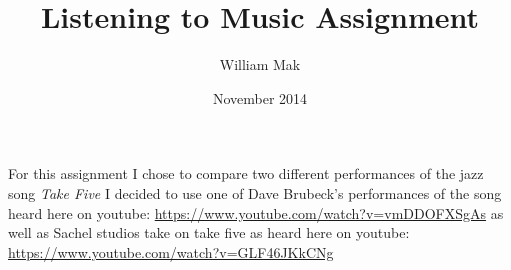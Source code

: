 \documentclass{article}
\title{Listening to Music Assignment}
\author{William Mak}
\date{November 2014}
\begin{document}
\maketitle

For this assignment I chose to compare two different performances of the jazz 
song {\it Take Five} I decided to use one of Dave Brubeck's performances of the 
song heard here on youtube:
\href{https://www.youtube.com/watch?v=vmDDOFXSgAs}{https://www.youtube.com/watch?v=vmDDOFXSgAs}
as well as Sachel studios take on take five as heard here on youtube:
\href{https://www.youtube.com/watch?v=GLF46JKkCNg}{https://www.youtube.com/watch?v=GLF46JKkCNg}
\end{document}
